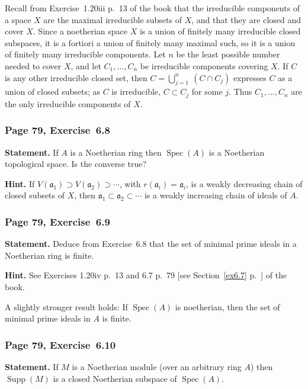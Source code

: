 \documentclass[12pt,letterpaper]{article}%
\newcommand{\oo}{\operatorname}\newcommand{\ooo}{\operatorname*}
\newcommand{\mf}{\mathfrak}
\newcommand{\aaa}{\mf a}
\newcommand{\Spec}{\operatorname{Spec}}\newcommand{\Sp}{\operatorname{Spec}}
\newcommand{\nn}{\noindent}
\begin{document}
Recall from Exercise~1.20iii p.~13 of the book that the irreducible components of a space $X$ are the maximal irreducible subsets of $X$, and that they are closed and cover $X$. Since a noetherian space $X$ is a union of finitely many irreducible closed subspaces, it is a fortiori a union of finitely many maximal such, so it is a union of finitely many irreducible components. Let $n$ be the least possible number needed to cover $X$, and let $C_1,\ldots,C_n$ be irreducible components covering $X$. If $C$ is any other irreducible closed set, then $C=\bigcup_{j=1}^n\ (C\cap C_j)$ expresses $C$ as a union of closed subsets; as $C$ is irreducible, $C\subset C_j$ for some $j$. Thus $C_1,\ldots,C_n$ are the only irreducible components of $X$. 

\subsubsection{Page 79, Exercise~6.8}\label{ex6.8}%

\textbf{Statement.} If $A$ is a Noetherian ring then $\Spec(A)$ is a Noetherian topological space. Is the converse true?

\nn\textbf{Hint.} If $V(\aaa_1)\supset V(\aaa_2)\supset\cdots$, with $r(\aaa_i)=\aaa_i$, is a weakly decreasing chain of closed subsets of $X$, then $\aaa_1\subset\aaa_2\subset\cdots$ is a weakly increasing chain of ideals of $A$. 

\subsubsection{Page 79, Exercise~6.9}%

\textbf{Statement.} Deduce from Exercise~6.8 that the set of minimal prime ideals in a Noetherian ring is finite.

\nn\textbf{Hint.} See Exercises 1.20iv p.~13 and 6.7 p.~79 [see Section~\ref{ex6.7} p.~\pageref{ex6.7}] of the book. 

A slightly stronger result holds: If $\Spec(A)$ is noetherian, then the set of minimal prime ideals in $A$ is finite. 

\subsubsection{Page 79, Exercise~6.10}%

\textbf{Statement.} If $M$ is a Noetherian module (over an arbitrary ring $A$) then $\oo{Supp}(M)$ is a closed Noetherian subspace of $\Spec(A)$.
\end{document}
